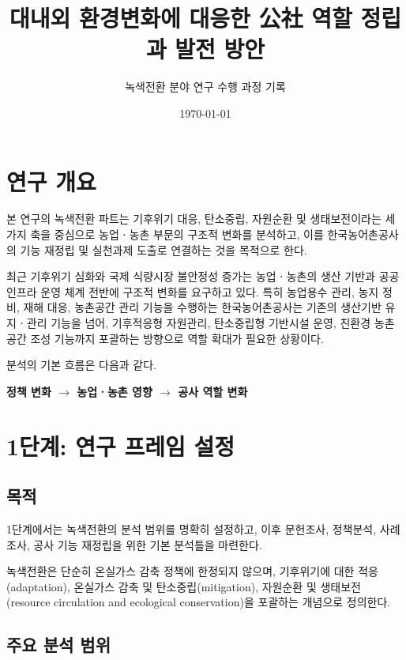\documentclass[11pt,a4paper]{article}
\title{\bfseries 대내외 환경변화에 대응한 公社 역할 정립과 발전 방안}
\author{녹색전환 분야 연구 수행 과정 기록}
\date{\today}
\begin{document}

\maketitle

\section*{연구 개요}

본 연구의 녹색전환 파트는 기후위기 대응, 탄소중립, 자원순환 및 생태보전이라는
세 가지 축을 중심으로 농업ㆍ농촌 부문의 구조적 변화를 분석하고,
이를 한국농어촌공사의 기능 재정립 및 실천과제 도출로 연결하는 것을 목적으로 한다.

최근 기후위기 심화와 국제 식량시장 불안정성 증가는 농업ㆍ농촌의 생산 기반과
공공 인프라 운영 체계 전반에 구조적 변화를 요구하고 있다.
특히 농업용수 관리, 농지 정비, 재해 대응, 농촌공간 관리 기능을 수행하는
한국농어촌공사는 기존의 생산기반 유지ㆍ관리 기능을 넘어,
기후적응형 자원관리, 탄소중립형 기반시설 운영,
친환경 농촌공간 조성 기능까지 포괄하는 방향으로
역할 확대가 필요한 상황이다.

분석의 기본 흐름은 다음과 같다.

\begin{center}
\textbf{정책 변화 $\rightarrow$ 농업ㆍ농촌 영향 $\rightarrow$ 공사 역할 변화}
\end{center}

\section*{1단계: 연구 프레임 설정}

\subsection*{목적}

1단계에서는 녹색전환의 분석 범위를 명확히 설정하고,
이후 문헌조사, 정책분석, 사례조사, 공사 기능 재정립을 위한 기본 분석틀을 마련한다.

녹색전환은 단순히 온실가스 감축 정책에 한정되지 않으며,
기후위기에 대한 적응(adaptation),
온실가스 감축 및 탄소중립(mitigation),
자원순환 및 생태보전(resource circulation and ecological conservation)을
포괄하는 개념으로 정의한다.

\subsection*{주요 분석 범위}
\end{document}
